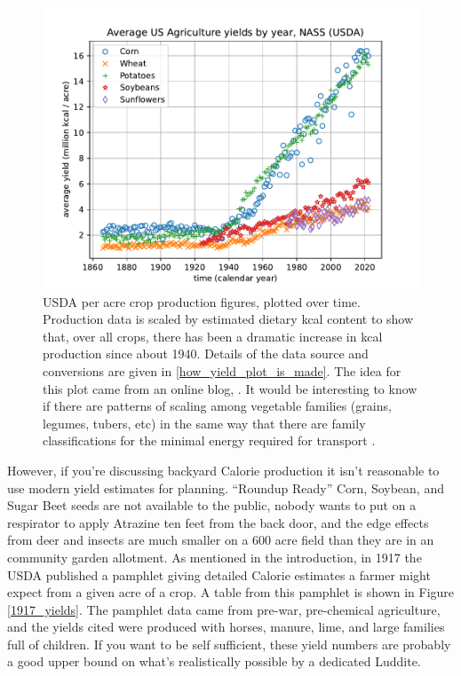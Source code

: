 \documentclass[12pt]{iopart}
\begin{document}
\begin{figure}[ht!]
\centering
\includegraphics[width=\columnwidth]{kcal_per_acre_yields.pdf}
\caption{
USDA per acre crop production figures, plotted over time.  Production data is scaled by estimated dietary kcal content to show that, over all crops, there has been a dramatic increase in kcal production since about 1940.  
Details of the data source and conversions are given in \ref{how_yield_plot_is_made}.
The idea for this plot came from an online blog, \cite{math_encounters}.  
It would be interesting to know if there are patterns of scaling among vegetable families (grains, legumes, tubers, etc) in the same way that there are family classifications for the minimal energy required for transport \cite{energetic_cost_of_moving}.
}
\label{ag_yields}
\end{figure}

However, if you're discussing backyard Calorie production it isn't reasonable to use modern yield estimates for planning.  ``Roundup Ready'' Corn, Soybean, and Sugar Beet seeds are not available to the public, nobody wants to put on a respirator to apply Atrazine ten feet from the back door,  and the edge effects from deer and insects are much smaller on a $600$ acre field than they are in an community garden allotment.  As mentioned in the introduction, in 1917 the USDA published a pamphlet \cite{USDA_1917_yields_pamphlet} giving detailed Calorie estimates a farmer might expect from a given acre of a crop.  A table from this pamphlet is shown in Figure \ref{1917_yields}.  
The pamphlet data came from pre-war, pre-chemical agriculture, and the yields cited were produced with horses, manure, lime, and large families full of children.  If you want to be self sufficient, these yield numbers are probably a good upper bound on what's realistically possible by a dedicated Luddite.  
\end{document}
